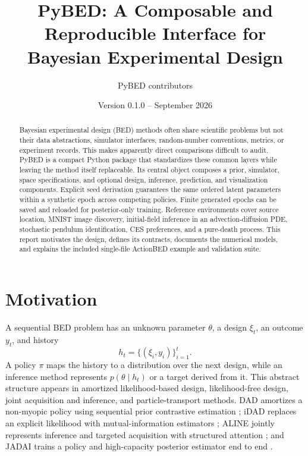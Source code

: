 \documentclass[11pt]{article}
\title{\textbf{PyBED: A Composable and Reproducible Interface for Bayesian Experimental Design}}
\author{PyBED contributors}
\date{Version 0.1.0 -- September 2026}
\begin{document}
\maketitle

\begin{abstract}
Bayesian experimental design (BED) methods often share scientific problems but not
their data abstractions, simulator interfaces, random-number conventions, metrics,
or experiment records. This makes apparently direct comparisons difficult to audit.
PyBED is a compact Python package that standardizes these common layers while leaving
the method itself replaceable. Its central object composes a prior, simulator, space
specifications, and optional design, inference, prediction, and visualization
components. Explicit seed derivation guarantees the same ordered latent parameters
within a synthetic epoch across competing policies. Finite generated epochs can be
saved and reloaded for posterior-only training. Reference environments cover source
location, MNIST image discovery, initial-field inference in an advection-diffusion
PDE, stochastic pendulum identification, CES preferences, and a pure-death process.
This report motivates the design, defines its contracts, documents the numerical
models, and explains the included single-file ActionBED example and validation suite.
\end{abstract}

\tableofcontents
\newpage

\section{Motivation}

A sequential BED problem has an unknown parameter $\theta$, a design $\xi_t$, an
outcome $y_t$, and history
\begin{equation}
  h_t = \{(\xi_i,y_i)\}_{i=1}^{t}.
\end{equation}
A policy $\pi$ maps the history to a distribution over the next design, while an
inference method represents $p(\theta\mid h_t)$ or a target derived from it. This
abstract structure appears in amortized likelihood-based design, likelihood-free
design, joint acquisition and inference, and particle-transport methods. DAD
amortizes a non-myopic policy using sequential prior contrastive estimation
\cite{foster2021dad}; iDAD replaces an explicit likelihood with mutual-information
estimators \cite{ivanova2021idad}; ALINE jointly represents inference and targeted
acquisition with structured attention \cite{huang2025aline}; and JADAI trains a
policy and high-capacity posterior estimator end to end \cite{bracher2025jadai}.
\end{document}
